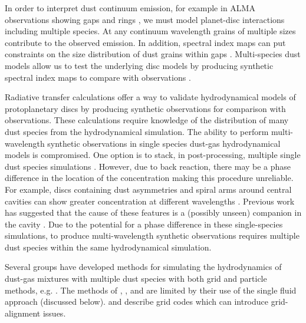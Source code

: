 \documentclass[fleqn,usenatbib]{mnras}
\begin{document}
In order to interpret dust continuum emission, for example in ALMA observations
showing gaps and rings \citep{ALMAPartnership2015ApJ...808L...3A,
Andrews2016ApJ...820L..40A}, we must model planet-disc interactions including
multiple species. At any continuum wavelength grains of multiple sizes
contribute to the observed emission. In addition, spectral index maps can put
constraints on the size distribution of dust grains within gaps
\citep{Huang2018ApJ...852..122H}. Multi-species dust models allow us to test the
underlying disc models by producing synthetic spectral index maps to compare
with observations \citep{Casassus2015ApJ...812..126C, Pinte2016ApJ...816...25P}.

Radiative transfer calculations offer a way to validate hydrodynamical models of
protoplanetary discs by producing synthetic observations for comparison with
observations. These calculations require knowledge of the distribution of many
dust species from the hydrodynamical simulation. The ability to perform
multi-wavelength synthetic observations in single species dust-gas
hydrodynamical models is compromised. One option is to stack, in
post-processing, multiple single dust species simulations
\citep{Dipierro2015MNRAS.453L..73D, Mentiplay2019MNRAS.484L.130M}. However, due
to back reaction, there may be a phase difference in the location of the
concentration making this procedure unreliable. For example, discs containing
dust asymmetries and spiral arms around central cavities can show greater
concentration at different wavelengths \citep{Casassus2015ApJ...812..126C,
van-der-Marel2015ApJ...810L...7V}. Previous work has suggested that the cause of
these features is a (possibly unseen) companion in the cavity
\citep{Price2018MNRAS.477.1270P,
Poblete2019MNRAS.489.2204P,Calcino2019MNRAS.490.2579C}. Due to the potential for
a phase difference in these single-species simulations, to produce
multi-wavelength synthetic observations requires multiple dust species within
the same hydrodynamical simulation.

Several groups have developed methods for simulating the hydrodynamics of
dust-gas mixtures with multiple dust species with both grid and particle
methods, e.g. \citet{Bai2010ApJS..190..297B, Porth2014ApJS..214....4P,
Hutchison2018MNRAS.476.2186H, Benitez-Llambay2019ApJS..241...25B,
Lebreuilly2019A&A...626A..96L, Li2019ApJ...878...39L}. The methods of
\citet{Benitez-Llambay2019ApJS..241...25B},
\citet{Lebreuilly2019A&A...626A..96L}, and \citet{Li2019ApJ...878...39L} are
limited by their use of the single fluid approach (discussed below).
\citet{Bai2010ApJS..190..297B} and \citet{Porth2014ApJS..214....4P} describe
grid codes which can introduce grid-alignment issues.
\end{document}
